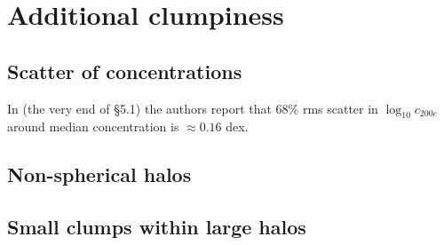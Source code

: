 
\section{Additional clumpiness}
\subsection{Scatter of concentrations}
In \cite{2014arXiv1407.4730D} (the very end of \S5.1) the authors report that 68\% rms scatter in $\log_{10}c_{200c}$ around median concentration is $\approx 0.16$ dex. 

\subsection{Non-spherical halos}

\subsection{Small clumps within large halos}
\cite{Belotsky_2014}